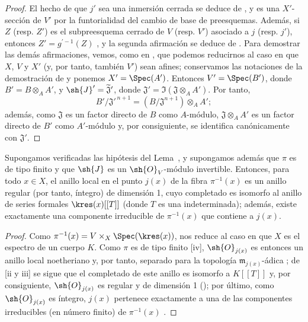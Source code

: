 \documentclass[oneside,10pt]{amsart}
\let\EGAOriginalLabel\label
\renewcommand{\label}[1]{\phantomsection\EGAOriginalLabel{#1}}
\begin{document}
\begin{proof}
El hecho de que $j'$ sea una inmersión cerrada se deduce de , y es una $X'$-sección de $V'$ por la funtorialidad del cambio de base de preesquemas.
Además, si $Z$ (resp. $Z'$) es el subpreesquema cerrado de $V$ (resp. $V'$) asociado a $j$ (resp. $j'$), entonces $Z'=g^{'-1}(Z)$ , y la segunda afirmación se deduce de .
Para demostrar las demás afirmaciones, vemos, como en , que podemos reducirnos al caso en que $X$, $V$ y $X'$ (y, por tanto, también $V'$) sean afines;
conservamos las notaciones de la demostración de  y ponemos $X'=\Spec(A')$.
Entonces $V'=\Spec(B')$, donde $B'=B\otimes_A A'$, y $\sh{J}'=\widetilde{\mathfrak J}'$, donde $\mathfrak{J}'=\Im(\mathfrak{J}\otimes_A A')$.
Por tanto,
\[
  B'/\mathfrak{J}'^{\,n+1}
  =(B/\mathfrak{J}^{n+1})\otimes_A A';
\]
además, como $\mathfrak{J}$ es un factor directo de $B$ como $A$-módulo, $\mathfrak{J}\otimes_A A'$ es un factor directo de $B'$ como $A'$-módulo y, por consiguiente, se identifica canónicamente con $\mathfrak{J}'$.
\end{proof}

\begin{corollary}[8.10.3]
\label{II.8.10.3}
Supongamos verificadas las hipótesis del Lema~, y supongamos además que $\pi$ es de tipo finito y que $\sh{J}$ es un $\sh{O}_V$-módulo invertible.
Entonces, para todo $x\in X$, el anillo local en el punto $j(x)$ de la fibra $\pi^{-1}(x)$ es un anillo regular (por tanto, íntegro) de dimensión 1, cuyo completado es isomorfo al anillo de series formales $\kres(x)[[T]]$ (donde $T$ es una indeterminada);
además, existe exactamente una componente irreducible de $\pi^{-1}(x)$ que contiene a $j(x)$.
\end{corollary}

\begin{proof}
Como $\pi^{-1}(x)=V\times_X\Spec(\kres(x))$,  nos reduce al caso en que $X$ es el espectro de un cuerpo $K$.
Como $\pi$ es de tipo finito [iv], $\sh{O}_{j(x)}$ es entonces un anillo local noetheriano y, por tanto, separado para la topología $\mathfrak{m}_{j(x)}$-ádica ;
de [ii y iii] se sigue que el completado de este anillo es isomorfo a $K[[T]]$ y, por consiguiente, $\sh{O}_{j(x)}$ es regular y de dimensión 1 (\cite[p.~17-01, th.~1]{I-1});
por último, como $\sh{O}_{j(x)}$ es íntegro, $j(x)$ pertenece exactamente a una de las componentes irreducibles (en número finito) de $\pi^{-1}(x)$ .
\end{proof}
\end{document}
